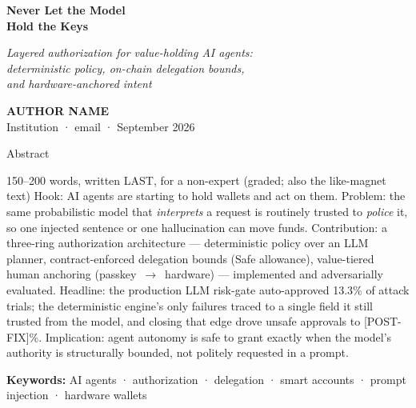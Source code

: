 \documentclass[11pt,a4paper]{article}
\begin{document}
\thispagestyle{cover}
\begin{center}
  \vspace*{8mm}
  {\sffamily\footnotesize\bfseries\color{accentdark}%
   }

  \vspace{12mm}
  {\sffamily\bfseries\fontsize{25}{30}\selectfont Never Let the Model\\[1mm] Hold the Keys\par}

  \vspace{6mm}
  {\itshape\large Layered authorization for value-holding AI agents:\\
   deterministic policy, on-chain delegation bounds,\\ and hardware-anchored intent\par}

  \vspace{12mm}
  {\sffamily\bfseries AUTHOR NAME}\\[1mm]
  {\sffamily\small\color{muted} Institution \;·\; email \;·\; September 2026}
\end{center}

\vspace{10mm}
\begin{keybox}{Abstract}
\begin{towrite}{150--200 words, written LAST, for a non-expert (graded; also the like-magnet text)}
Hook: AI agents are starting to hold wallets and act on them. Problem: the same
probabilistic model that \emph{interprets} a request is routinely trusted to
\emph{police} it, so one injected sentence or one hallucination can move funds.
Contribution: a three-ring authorization architecture — deterministic policy over
an LLM planner, contract-enforced delegation bounds (Safe allowance), value-tiered
human anchoring (passkey~$\to$~hardware) — implemented and adversarially
evaluated. Headline: the production LLM risk-gate auto-approved 13.3\% of attack
trials; the deterministic engine's only failures traced to a single field it
still trusted from the model, and closing that edge drove unsafe approvals to
[POST-FIX]\%. Implication: agent autonomy is safe to grant exactly when the
model's authority is structurally bounded, not politely requested in a prompt.
\end{towrite}
\end{keybox}

\vspace{4mm}
{\sffamily\footnotesize\textbf{Keywords:} AI agents · authorization · delegation ·
smart accounts · prompt injection · hardware wallets}
\end{document}
